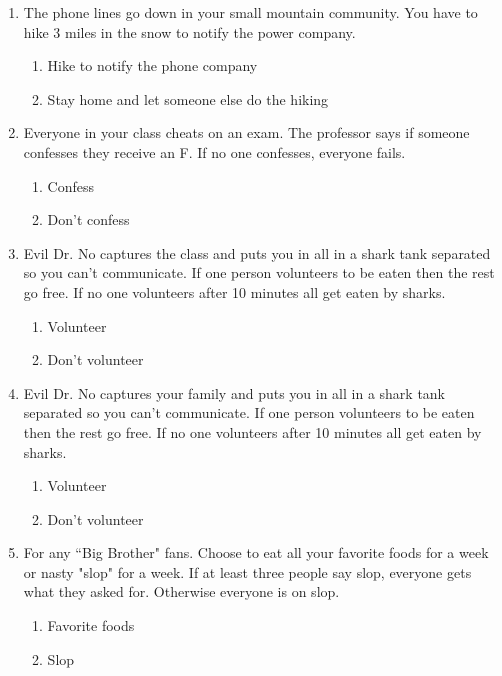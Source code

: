\begin{enumerate}
\item The phone lines go down in your small mountain community. You have to hike 3 miles in the snow to notify the power company.

\begin{enumerate}
\item Hike to notify the phone company
\item Stay home and let someone else do the hiking
\end{enumerate}

\item Everyone in your class cheats on an exam. The professor says if someone confesses they receive an F. If no one confesses, everyone fails.

\begin{enumerate}
\item Confess
\item Don't confess
\end{enumerate}

\item Evil Dr. No captures the class and puts you in all in a shark tank separated so you can't communicate. If one person volunteers to be eaten then the rest go free. If no one volunteers after 10 minutes all get eaten by sharks.

\begin{enumerate}
\item Volunteer
\item Don't volunteer
\end{enumerate}

\item Evil Dr. No captures your family and puts you in all in a shark tank separated so you can't communicate. If one person volunteers to be eaten then the rest go free. If no one volunteers after 10 minutes all get eaten by sharks.

\begin{enumerate}
\item Volunteer
\item Don't volunteer
\end{enumerate}

\item For any ``Big Brother" fans. Choose to eat all your favorite foods for a week or nasty "slop" for a week. If at least three people say slop, everyone gets what they asked for. Otherwise everyone is on slop.

\begin{enumerate}
\item Favorite foods
\item Slop
\end{enumerate}


\end{enumerate}
